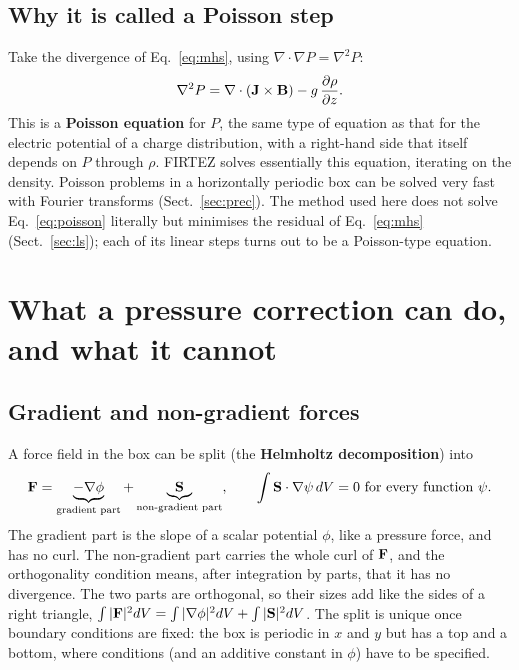 \subsection{Why it is called a Poisson step}
Take the divergence of Eq.~\eqref{eq:mhs}, using $\nabla\cdot\nabla P=\nabla^2P$:
\begin{equation}
\nabla^2P=\nabla\cdot(\mathbf J\times\mathbf B)-g\,\frac{\partial\rho}{\partial z}.\label{eq:poisson}
\end{equation}
This is a \textbf{Poisson equation} for $P$, the same type of equation as that for the electric potential of a charge
distribution, with a right-hand side that itself depends on $P$ through $\rho$. FIRTEZ solves essentially this equation,
iterating on the density. Poisson problems in a horizontally periodic box can be solved very fast with Fourier transforms
(Sect.~\ref{sec:prec}). The method used here does not solve Eq.~\eqref{eq:poisson} literally but minimises the residual of
Eq.~\eqref{eq:mhs} (Sect.~\ref{sec:ls}); each of its linear steps turns out to be a Poisson-type equation.



\section{What a pressure correction can do, and what it cannot}\label{sec:helm}
\subsection{Gradient and non-gradient forces}
A force field in the box can be split (the \textbf{Helmholtz decomposition}) into
\begin{equation}
\mathbf F=\underbrace{-\nabla\phi}_{\text{gradient part}}+\underbrace{\mathbf S}_{\text{non-gradient part}},
\qquad \int\mathbf S\cdot\nabla\psi\,dV=0\ \text{for every function }\psi .
\end{equation}
The gradient part is the slope of a scalar potential $\phi$, like a pressure force, and has no curl. The non-gradient part
carries the whole curl of $\mathbf F$, and the orthogonality condition means, after integration by parts, that it has no divergence.
The two parts are orthogonal, so their sizes add like the sides of a right triangle,
$\int|\mathbf F|^2dV=\int|\nabla\phi|^2dV+\int|\mathbf S|^2dV$. The split is unique once boundary conditions are fixed: the box is
periodic in $x$ and $y$ but has a top and a bottom, where conditions (and an additive constant in $\phi$) have to be
specified.

